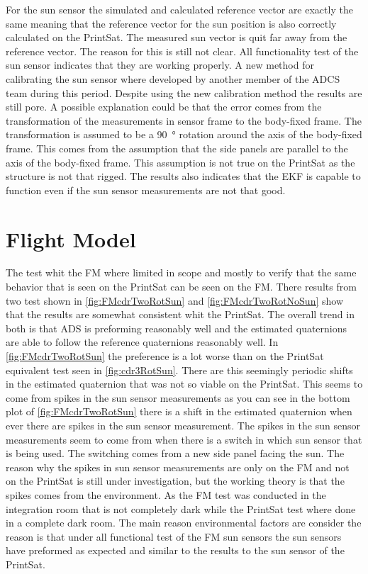 For the sun sensor the simulated and calculated reference vector are exactly the same meaning that the reference vector for the sun position is also correctly calculated on the PrintSat. The measured sun vector is quit far away from the reference vector. The reason for this is still not clear. All functionality test of the sun sensor indicates that they are working properly. A new method for calibrating the sun sensor where developed by another member of the ADCS team during this period. Despite using the new calibration method the results are still pore. A possible explanation could be that the error comes from the transformation of the measurements in sensor frame to the body-fixed frame. The transformation is assumed to be a \SI{90}{\degree} rotation around the axis of the body-fixed frame. This comes from the assumption that the side panels are parallel to the axis of the body-fixed frame. This assumption is not true on the PrintSat as the structure is not that rigged. The results also indicates that the EKF is capable to function even if the sun sensor measurements are not that good.                      

\section{Flight Model}
The test whit the FM where limited in scope and mostly to verify that the same behavior that is seen on the PrintSat can be seen on the FM. There results from two test shown in \autoref{fig:FMcdrTwoRotSun} and \autoref{fig:FMcdrTwoRotNoSun} show that the results are somewhat consistent whit the PrintSat. The overall trend in both is that ADS is preforming reasonably well and the estimated quaternions are able to follow the reference quaternions reasonably well. In \autoref{fig:FMcdrTwoRotSun} the preference is a lot worse than on the PrintSat equivalent test seen in \autoref{fig:cdr3RotSun}. There are this seemingly periodic shifts in the estimated quaternion that was not so viable on the PrintSat. This seems to come from spikes in the sun sensor measurements as you can see in the bottom plot of \autoref{fig:FMcdrTwoRotSun} there is a shift in the estimated quaternion when ever there are spikes in the sun sensor measurement. The spikes in the sun sensor measurements seem to come from when there is a switch in which sun sensor that is being used. The switching comes from  a new side panel facing the sun. The reason why the spikes in sun sensor measurements are only on the FM and not on the PrintSat is still under investigation, but the working theory is that the spikes comes from the environment. As the FM test was conducted in the integration room that is not completely dark while the PrintSat test where done in a complete dark room. The main reason environmental factors are consider the reason is that under all functional test of the FM sun sensors the sun sensors have preformed as expected and similar to the results to the sun sensor of the PrintSat.   


